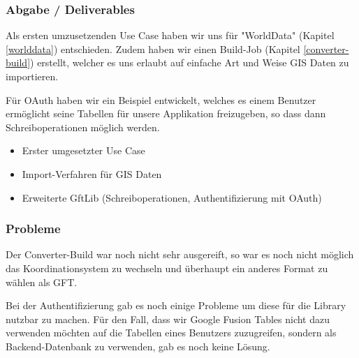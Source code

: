 \subsubsection{Abgabe / Deliverables}
Als ersten umzusetzenden Use Case haben wir uns für "WorldData" (Kapitel \ref{worlddata}) entschieden. Zudem haben wir einen Build-Job (Kapitel \ref{converter-build}) erstellt, welcher es uns erlaubt auf einfache Art und Weise GIS Daten zu importieren.

Für OAuth haben wir ein Beispiel entwickelt, welches es einem Benutzer ermöglicht seine Tabellen für unsere Applikation freizugeben, so dass dann Schreiboperationen möglich werden.

\begin{itemize}
	\item Erster umgesetzter Use Case
	\item Import-Verfahren für GIS Daten
	\item Erweiterte GftLib (Schreiboperationen, Authentifizierung mit OAuth)
\end{itemize}

\subsubsection{Probleme}
Der Converter-Build war noch nicht sehr ausgereift, so war es noch nicht möglich das Koordinationsystem zu wechseln und überhaupt ein anderes Format zu wählen als GFT.

Bei der Authentifizierung gab es noch einige Probleme um diese für die Library nutzbar zu machen. Für den Fall, dass wir Google Fusion Tables nicht dazu verwenden möchten auf die Tabellen eines Benutzers zuzugreifen, sondern als Backend-Datenbank zu verwenden, gab es noch keine Lösung.
